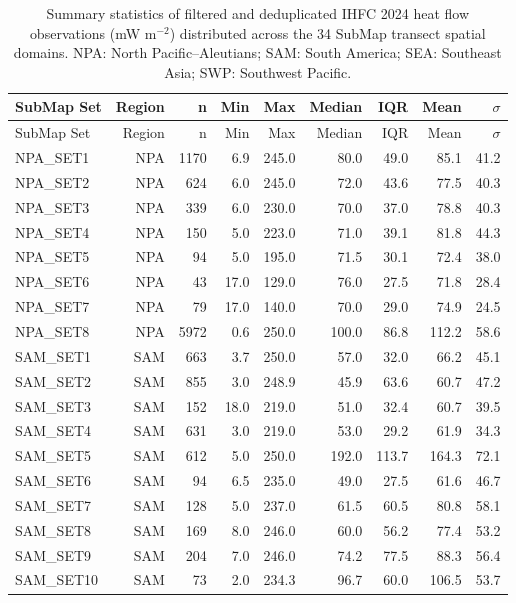 \documentclass[final]{agujournal2019}
\begin{document}
\begin{longtable}[]{@{}lrrrrrrrr@{}}
\caption{Summary statistics of filtered and deduplicated IHFC 2024 heat
flow observations (mW m\(^{-2}\)) distributed across the 34 SubMap
transect spatial domains. NPA: North Pacific--Aleutians; SAM: South
America; SEA: Southeast Asia; SWP: Southwest
Pacific.}\label{tbl:global-obs-summary-table}\tabularnewline
\toprule\noalign{}
SubMap Set & Region & n & Min & Max & Median & IQR & Mean &
\(\sigma\) \\
\midrule\noalign{}
\endfirsthead
\toprule\noalign{}
SubMap Set & Region & n & Min & Max & Median & IQR & Mean &
\(\sigma\) \\
\midrule\noalign{}
\endhead
\bottomrule\noalign{}
\endlastfoot
NPA\_SET1 & NPA & 1170 & 6.9 & 245.0 & 80.0 & 49.0 & 85.1 & 41.2 \\
NPA\_SET2 & NPA & 624 & 6.0 & 245.0 & 72.0 & 43.6 & 77.5 & 40.3 \\
NPA\_SET3 & NPA & 339 & 6.0 & 230.0 & 70.0 & 37.0 & 78.8 & 40.3 \\
NPA\_SET4 & NPA & 150 & 5.0 & 223.0 & 71.0 & 39.1 & 81.8 & 44.3 \\
NPA\_SET5 & NPA & 94 & 5.0 & 195.0 & 71.5 & 30.1 & 72.4 & 38.0 \\
NPA\_SET6 & NPA & 43 & 17.0 & 129.0 & 76.0 & 27.5 & 71.8 & 28.4 \\
NPA\_SET7 & NPA & 79 & 17.0 & 140.0 & 70.0 & 29.0 & 74.9 & 24.5 \\
NPA\_SET8 & NPA & 5972 & 0.6 & 250.0 & 100.0 & 86.8 & 112.2 & 58.6 \\
SAM\_SET1 & SAM & 663 & 3.7 & 250.0 & 57.0 & 32.0 & 66.2 & 45.1 \\
SAM\_SET2 & SAM & 855 & 3.0 & 248.9 & 45.9 & 63.6 & 60.7 & 47.2 \\
SAM\_SET3 & SAM & 152 & 18.0 & 219.0 & 51.0 & 32.4 & 60.7 & 39.5 \\
SAM\_SET4 & SAM & 631 & 3.0 & 219.0 & 53.0 & 29.2 & 61.9 & 34.3 \\
SAM\_SET5 & SAM & 612 & 5.0 & 250.0 & 192.0 & 113.7 & 164.3 & 72.1 \\
SAM\_SET6 & SAM & 94 & 6.5 & 235.0 & 49.0 & 27.5 & 61.6 & 46.7 \\
SAM\_SET7 & SAM & 128 & 5.0 & 237.0 & 61.5 & 60.5 & 80.8 & 58.1 \\
SAM\_SET8 & SAM & 169 & 8.0 & 246.0 & 60.0 & 56.2 & 77.4 & 53.2 \\
SAM\_SET9 & SAM & 204 & 7.0 & 246.0 & 74.2 & 77.5 & 88.3 & 56.4 \\
SAM\_SET10 & SAM & 73 & 2.0 & 234.3 & 96.7 & 60.0 & 106.5 & 53.7 \\

\end{longtable}
\end{document}
